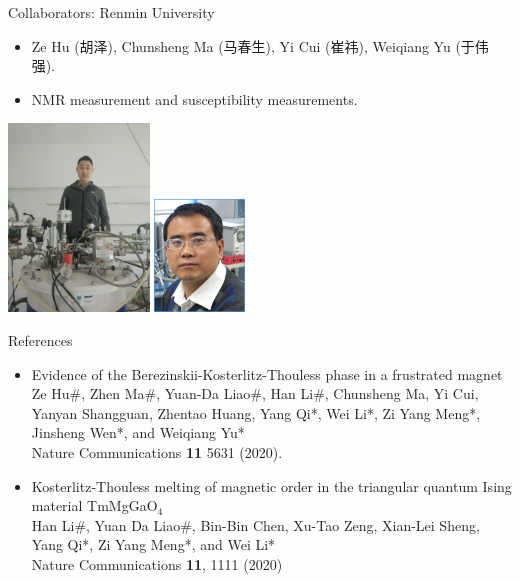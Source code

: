 \documentclass[xcolor=table, aspectratio=1610,ignorenonframetext]{beamer}
\begin{document}
\begin{frame}{Collaborators: Renmin University}
\begin{itemize}
	\item Ze Hu (胡泽), Chunsheng Ma (马春生), Yi Cui (崔祎), Weiqiang Yu (于伟强).
	\item NMR measurement and susceptibility measurements.
\end{itemize}
	\begin{center}
		\includegraphics[height=5cm]{../people/zehu_large}
		\includegraphics[height=3cm]{../people/weiqiangyu}
	\end{center}
\end{frame}

\begin{frame}{References}
\begin{itemize}
	\item Evidence of the Berezinskii-Kosterlitz-Thouless phase in a frustrated magnet\\
Ze Hu\#, Zhen Ma\#, Yuan-Da Liao\#, Han Li\#, Chunsheng Ma, Yi Cui, Yanyan Shangguan, Zhentao Huang, Yang Qi*, Wei Li*, Zi Yang Meng*, Jinsheng Wen*, and Weiqiang Yu*\\
Nature Communications \textbf{11} 5631 (2020).
	\item Kosterlitz-Thouless melting of magnetic order in the triangular quantum Ising material TmMgGaO${}_4$\\
Han Li\#, Yuan Da Liao\#, Bin-Bin Chen, Xu-Tao Zeng, Xian-Lei Sheng, Yang Qi*, Zi Yang Meng*, and Wei Li*\\
Nature Communications \textbf{11}, 1111 (2020)
\end{itemize}
\end{frame}
\end{document}
